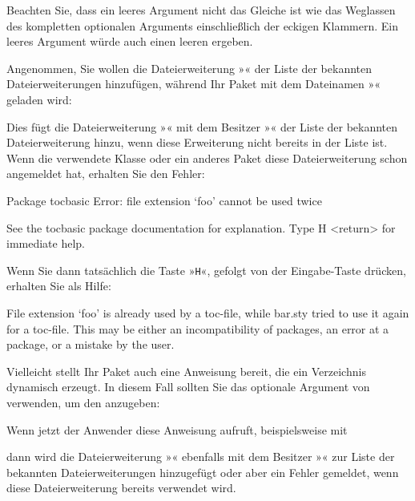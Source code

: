Beachten Sie, dass ein leeres Argument 
nicht das Gleiche ist wie das Weglassen des kompletten optionalen Arguments
einschließlich der eckigen Klammern. Ein leeres Argument würde auch einen
leeren  ergeben.
\begin{Example}
  Angenommen, Sie wollen die Dateierweiterung »« der Liste der
  bekannten Dateierweiterungen hinzufügen, während Ihr Paket mit dem
  Dateinamen »« geladen wird:
\begin{lstcode}
\end{lstcode}
  Dies fügt die Dateierweiterung »« mit dem Besitzer
  »« der Liste der bekannten Dateierweiterung hinzu, wenn diese
  Erweiterung nicht bereits in der Liste ist. Wenn die verwendete
  Klasse oder ein anderes Paket diese Dateierweiterung schon angemeldet hat,
  erhalten Sie den Fehler:
\begin{lstoutput}[breakatwhitespace]
  Package tocbasic Error: file extension `foo' cannot be used twice

  See the tocbasic package documentation for explanation.
  Type H <return> for immediate help.
\end{lstoutput}
  Wenn Sie dann tatsächlich die Taste »\texttt{H}«, gefolgt von der
  Eingabe-Taste drücken, erhalten Sie als Hilfe:
\begin{lstoutput}[breakatwhitespace]
  File extension `foo' is already used by a toc-file, while bar.sty
  tried to use it again for a toc-file.
  This may be either an incompatibility of packages, an error at a package,
  or a mistake by the user.
\end{lstoutput}

  Vielleicht stellt Ihr Paket auch eine Anweisung bereit, die ein
  Verzeichnis dynamisch erzeugt. In diesem Fall sollten Sie das
  optionale Argument von  verwenden, um den
   anzugeben:
\begin{lstcode}
  \newcommand*{\createnewlistofsomething}[1]{%
    \addtotoclist[bar.sty]{#1}%
  }
\end{lstcode}
  Wenn jetzt der Anwender diese Anweisung aufruft, beispielsweise mit
\begin{lstcode}
\end{lstcode}
  dann wird die Dateierweiterung »« ebenfalls mit dem Besitzer
  »« zur Liste der bekannten Dateierweiterungen hinzugefügt
  oder aber ein Fehler gemeldet, wenn diese Dateierweiterung bereits verwendet
  wird. 
\end{Example}

